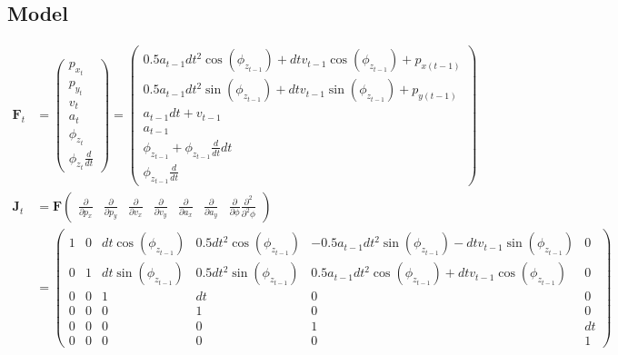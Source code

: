 \documentclass{article}
\begin{document}
\newpage
\subsection{Model}

\begin{align}
 \textbf{F}_{t} &=
 \left(\begin{matrix}
  p_{x_t} \\
  p_{y_t} \\
  v_t \\
  a_t \\
  \phi_{z_t} \\
  \phi_{z_t} \frac{d}{dt}
 \end{matrix}\right)
 = \left(\begin{matrix}0.5 a_{t-1} dt^{2} \cos{\left(\phi_{z_{t-1}} \right)} + dt v_{t-1} \cos{\left(\phi_{z_{t-1}} \right)} + p_{x (t-1)}\\0.5 a_{t-1} dt^{2} \sin{\left(\phi_{z_{t-1}} \right)} + dt v_{t-1} \sin{\left(\phi_{z_{t-1}} \right)} + p_{y (t-1)}\\a_{t-1} dt + v_{t-1}\\a_{t-1}\\\phi_{z_{t-1}} + \phi_{z_{t-1}}\frac{d}{dt} dt\\\phi_{z_{t-1}}\frac{d}{dt}\end{matrix}\right)
 \\
  \textbf{J}_t &= 
  \textbf{F}\left(\begin{matrix}
    \frac{\partial}{\partial p_x} & \frac{\partial}{\partial p_y} & \frac{\partial}{\partial v_x} & \frac{\partial}{\partial v_y} & \frac{\partial}{\partial a_x} & \frac{\partial}{\partial a_y} & \frac{\partial}{\partial \phi}\frac{\partial^2}{\partial^2 \phi}
  \end{matrix}\right) \\
  &= \left(\begin{matrix}1 & 0 & dt \cos{\left(\phi_{z_{t-1}} \right)} & 0.5 dt^{2} \cos{\left(\phi_{z_{t-1}} \right)} & - 0.5 a_{t-1} dt^{2} \sin{\left(\phi_{z_{t-1}} \right)} - dt v_{t-1} \sin{\left(\phi_{z_{t-1}} \right)} & 0\\0 & 1 & dt \sin{\left(\phi_{z_{t-1}} \right)} & 0.5 dt^{2} \sin{\left(\phi_{z_{t-1}} \right)} & 0.5 a_{t-1} dt^{2} \cos{\left(\phi_{z_{t-1}} \right)} + dt v_{t-1} \cos{\left(\phi_{z_{t-1}} \right)} & 0\\0 & 0 & 1 & dt & 0 & 0\\0 & 0 & 0 & 1 & 0 & 0\\0 & 0 & 0 & 0 & 1 & dt\\0 & 0 & 0 & 0 & 0 & 1\end{matrix}\right)
\end{align}
\end{document}
